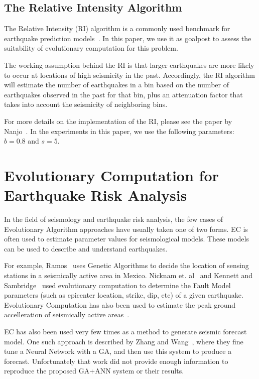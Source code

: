 \documentclass{sig-alternate}
\begin{document}
\subsection{The Relative Intensity Algorithm}

The Relative Intensity (RI) algorithm is a commonly used benchmark for
earthquake prediction models~\cite{Nanjo2011}. In this paper, we use
it as goalpost to assess the suitability of evolutionary computation
for this problem.

The working assumption behind the RI is that larger earthquakes are
more likely to occur at locations of high seismicity in the
past. Accordingly, the RI algorithm will estimate the number of
earthquakes in a bin based on the number of earthquakes observed in
the past for that bin, plus an attenuation factor that takes into
account the seismicity of neighboring bins.

For more details on the implementation of the RI, please see the paper
by Nanjo~\cite{Nanjo2011}. In the experiments in this paper, we use
the following parameters: $b = 0.8$ and $s = 5$.

\section{Evolutionary Computation for Earthquake Risk Analysis}

In the field of seismology and earthquake risk analysis, the few cases
of Evolutionary Algorithm approaches have usually taken one of two
forms. EC is often used to estimate parameter values for seismological
models.  These models can be used to describe and understand
earthquakes.

For example, Ramos~\cite{Ramos2011} uses Genetic Algorithms to decide
the location of sensing stations in a seismically active area in
Mexico. Nicknam et. al~\cite{Nicknam2010} and Kennett and
Sambridge~\cite{Kennett1992} used evolutionary computation to
determine the Fault Model parameters (such as epicenter location,
strike, dip, etc) of a given earthquake. Evolutionary Computation has
also been used to estimate the peak ground accelleration of
seismically active areas~\cite{Kermani2009, Cabalar2009}.

EC has also been used very few times as a method to generate seismic
forecast model. One such approach is described by Zhang and
Wang~\cite{Zhang2012}, where they fine tune a Neural Network with a
GA, and then use this system to produce a forecast. Unfortunately that
work did not provide enough information to reproduce the proposed
GA+ANN system or their results.
\end{document}
